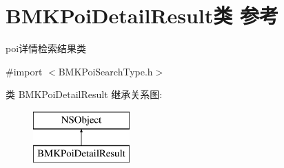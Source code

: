 \hypertarget{interface_b_m_k_poi_detail_result}{}\section{B\+M\+K\+Poi\+Detail\+Result类 参考}
\label{interface_b_m_k_poi_detail_result}


poi详情检索结果类  




{\ttfamily \#import $<$B\+M\+K\+Poi\+Search\+Type.\+h$>$}

类 B\+M\+K\+Poi\+Detail\+Result 继承关系图\+:\begin{figure}[H]
\begin{center}
\leavevmode
\includegraphics[height=2.000000cm]{interface_b_m_k_poi_detail_result}
\end{center}
\end{figure}

